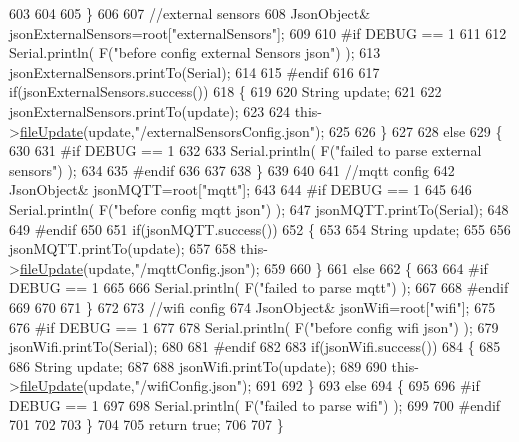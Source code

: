 \begin{DoxyCode}
603 
604 
605     \}
606     
607     \textcolor{comment}{//external sensors}
608         JsonObject& jsonExternalSensors=root[\textcolor{stringliteral}{"externalSensors"}];
609 
610 \textcolor{preprocessor}{#if DEBUG == 1 }
611 
612     Serial.println( F(\textcolor{stringliteral}{"before config external Sensors json"}) );
613     jsonExternalSensors.printTo(Serial);
614 
615 \textcolor{preprocessor}{#endif}
616 
617     \textcolor{keywordflow}{if}(jsonExternalSensors.success())
618     \{
619 
620         String update;
621     
622         jsonExternalSensors.printTo(update);
623 
624         this->\hyperlink{class_cool_file_system_a13f2958f5b87757c31fc53797a30d23a}{fileUpdate}(update,\textcolor{stringliteral}{"/externalSensorsConfig.json"});       
625 
626     \}
627 
628     \textcolor{keywordflow}{else}
629     \{   
630 
631 \textcolor{preprocessor}{    #if DEBUG == 1}
632         
633         Serial.println( F(\textcolor{stringliteral}{"failed to parse external sensors"}) );
634 
635 \textcolor{preprocessor}{    #endif}
636 
637 
638     \}
639 
640     
641     \textcolor{comment}{//mqtt config}
642         JsonObject& jsonMQTT=root[\textcolor{stringliteral}{"mqtt"}];
643     
644 \textcolor{preprocessor}{#if DEBUG == 1 }
645 
646     Serial.println( F(\textcolor{stringliteral}{"before config mqtt json"}) );
647     jsonMQTT.printTo(Serial);
648 
649 \textcolor{preprocessor}{#endif}
650 
651     \textcolor{keywordflow}{if}(jsonMQTT.success())
652     \{
653 
654         String update;
655     
656         jsonMQTT.printTo(update);
657 
658         this->\hyperlink{class_cool_file_system_a13f2958f5b87757c31fc53797a30d23a}{fileUpdate}(update,\textcolor{stringliteral}{"/mqttConfig.json"});      
659 
660     \}
661     \textcolor{keywordflow}{else}
662     \{
663 
664 \textcolor{preprocessor}{    #if DEBUG == 1 }
665 
666         Serial.println( F(\textcolor{stringliteral}{"failed to parse mqtt"}) );
667     
668 \textcolor{preprocessor}{    #endif}
669 
670     
671     \}   
672 
673     \textcolor{comment}{//wifi config}
674         JsonObject& jsonWifi=root[\textcolor{stringliteral}{"wifi"}];
675     
676 \textcolor{preprocessor}{#if DEBUG == 1 }
677 
678     Serial.println( F(\textcolor{stringliteral}{"before config wifi json"}) );
679     jsonWifi.printTo(Serial);
680 
681 \textcolor{preprocessor}{#endif}
682 
683     \textcolor{keywordflow}{if}(jsonWifi.success())
684     \{
685 
686         String update;
687     
688         jsonWifi.printTo(update);
689 
690         this->\hyperlink{class_cool_file_system_a13f2958f5b87757c31fc53797a30d23a}{fileUpdate}(update,\textcolor{stringliteral}{"/wifiConfig.json"});      
691 
692     \}
693     \textcolor{keywordflow}{else}
694     \{
695 
696 \textcolor{preprocessor}{    #if DEBUG == 1 }
697 
698         Serial.println( F(\textcolor{stringliteral}{"failed to parse wifi"}) );
699     
700 \textcolor{preprocessor}{    #endif}
701 
702     
703     \}   
704         
705     \textcolor{keywordflow}{return} \textcolor{keyword}{true};
706 
707 \}   
\end{DoxyCode}
